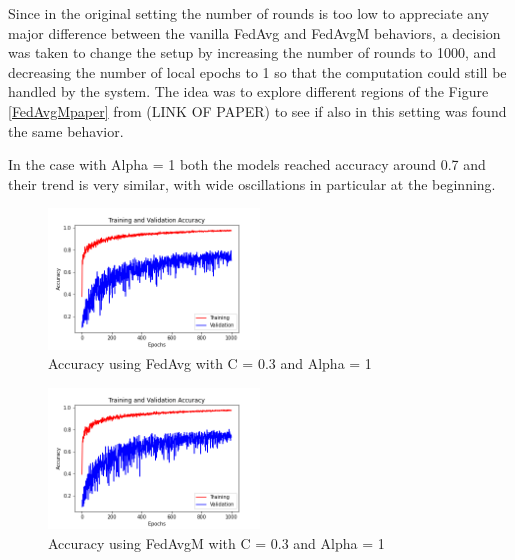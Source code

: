 \documentclass[twocolumn]{article}
\begin{document}
Since in the original setting the number of rounds is too low to appreciate any major difference between the vanilla FedAvg and FedAvgM behaviors, a decision was taken to change the setup by increasing the number of rounds to 1000, and decreasing the number of local epochs to 1 so that the computation could still be handled by the system.
The idea was to explore different regions of the Figure \ref{FedAvgMpaper} from (LINK OF PAPER) to see if also in this setting was found the same behavior.


In the case with Alpha = 1 both the models reached accuracy around 0.7 and their trend is very similar, with wide oscillations in particular at the beginning.

\begin{figure}
    \centering
    \includegraphics[width=0.5\textwidth,height=.3\textheight]{9_AccuracyFedAvg_C0.3A_1.png}
    \caption{Accuracy using FedAvg with C = 0.3 and Alpha = 1}
     \label{AccFedAvgC0.3A1} 
\end{figure}

\begin{figure}
    \centering
    \includegraphics[width=0.5\textwidth,height=.3\textheight]{9_AccuracyFedAvgM_C0.3A_1.png}
    \caption{Accuracy using FedAvgM with C = 0.3 and Alpha = 1}
     \label{AccFedAvgMC0.3A1} 
\end{figure}
\end{document}
